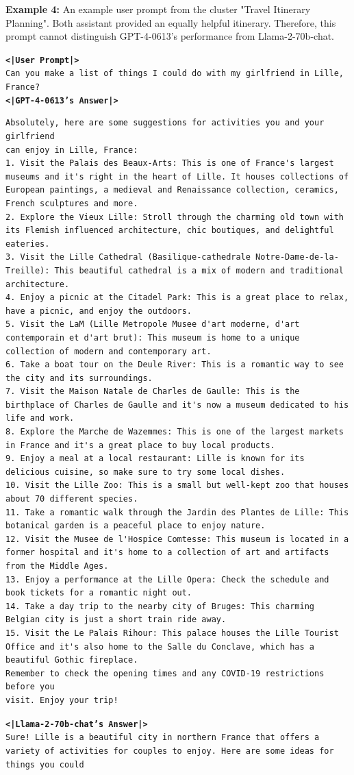 \documentclass{article}
\begin{document}
\newpage
\textbf{Example 4:} An example user prompt from the cluster "Travel Itinerary Planning". Both assistant provided an equally helpful itinerary. Therefore, this prompt cannot distinguish GPT-4-0613's performance from Llama-2-70b-chat. 
\begin{tcolorbox}
\texttt{\textbf{<|User Prompt|>} \\
Can you make a list of things I could do with my girlfriend in Lille, France?} \\

\texttt{\textbf{<|GPT-4-0613's Answer|>}}
\begin{lstlisting}
Absolutely, here are some suggestions for activities you and your girlfriend 
can enjoy in Lille, France:
1. Visit the Palais des Beaux-Arts: This is one of France's largest museums and it's right in the heart of Lille. It houses collections of European paintings, a medieval and Renaissance collection, ceramics, French sculptures and more.
2. Explore the Vieux Lille: Stroll through the charming old town with its Flemish influenced architecture, chic boutiques, and delightful eateries.
3. Visit the Lille Cathedral (Basilique-cathedrale Notre-Dame-de-la-Treille): This beautiful cathedral is a mix of modern and traditional architecture.
4. Enjoy a picnic at the Citadel Park: This is a great place to relax, have a picnic, and enjoy the outdoors.
5. Visit the LaM (Lille Metropole Musee d'art moderne, d'art contemporain et d'art brut): This museum is home to a unique collection of modern and contemporary art.
6. Take a boat tour on the Deule River: This is a romantic way to see the city and its surroundings.
7. Visit the Maison Natale de Charles de Gaulle: This is the birthplace of Charles de Gaulle and it's now a museum dedicated to his life and work.
8. Explore the Marche de Wazemmes: This is one of the largest markets in France and it's a great place to buy local products.
9. Enjoy a meal at a local restaurant: Lille is known for its delicious cuisine, so make sure to try some local dishes.
10. Visit the Lille Zoo: This is a small but well-kept zoo that houses about 70 different species.
11. Take a romantic walk through the Jardin des Plantes de Lille: This botanical garden is a peaceful place to enjoy nature.
12. Visit the Musee de l'Hospice Comtesse: This museum is located in a former hospital and it's home to a collection of art and artifacts from the Middle Ages.
13. Enjoy a performance at the Lille Opera: Check the schedule and book tickets for a romantic night out.
14. Take a day trip to the nearby city of Bruges: This charming Belgian city is just a short train ride away.
15. Visit the Le Palais Rihour: This palace houses the Lille Tourist Office and it's also home to the Salle du Conclave, which has a beautiful Gothic fireplace.
Remember to check the opening times and any COVID-19 restrictions before you 
visit. Enjoy your trip!
\end{lstlisting}
\texttt{\textbf{<|Llama-2-70b-chat's Answer|>}} \\
\texttt{Sure! Lille is a beautiful city in northern France that offers a variety of activities for couples to enjoy. Here are some ideas for things you could}
\end{tcolorbox}
\end{document}
